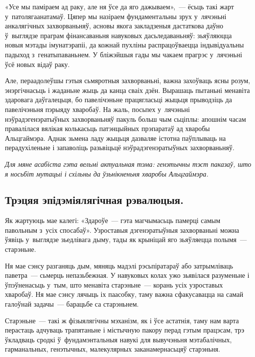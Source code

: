 
«Усе мы паміраем ад раку, але ня ўсе да яго дажываем»,~--- ёсьць такі жарт у~патолягаанатамаў. Цяпер мы назіраем фундаментальны зрух у~лячэньні анкалягічных захворваньняў, асновы якога закладзеныя дастаткова даўно ў~выглядзе праграм фінансаваньня навуковых дасьледаваньняў: зьяўляюцца новыя мэтады імунатэрапіі, да кожнай пухліны распрацоўваецца індывідуальны падыход з~генатыпаваньнем. У бліжэйшыя гады мы чакаем прагрэс у~лячэньні ўсё новых відаў раку.

Але, пераадолеўшы гэтыя сьмяротныя захворваньні, важна захоўваць ясны розум, энэргічнасьць і жаданьне жыць да канца сваіх дзён. Вырашаць пытаньні менавіта здаровага даўгалецьця, бо павелічэньне працягласьці жыцьця прыводзіць да павелічэньня пэрыяду хваробаў. На жаль, посьпех у~лячэньні нэўрадэгенэратыўных захворваньняў пакуль больш чым сьціплы: апошнім часам правалілася вялікая колькасьць патэнцыйных прэпаратаў ад хваробы Альцгаймэра. Аднак зьмена ладу жыцьця дазваляе істотна паўплываць на перадухіленьне і запаволіць разьвіцьцё нэўрадэгенэратыўных захворваньняў. 

\emph{Для мяне асабіста гэта вельмі актуальная тэма: генэтычны тэст паказаў, што я носьбіт мутацыі і схільны да ўзьнікненьня хваробы Альцгаймэра.}

\subsection*{Трэцяя эпідэміялягічная рэвалюцыя.}

Як жартуюць мае калегі: «Здароўе~--- гэта магчымасьць памерці самым павольным з~усіх спосабаў». Узроставыя дэгенэратыўныя захворваньні можна ўявіць у~выглядзе зьедлівага дыму, тады як крыніцай яго зьяўляецца полымя~--- старэньне.

Ня мае сэнсу разганяць дым, мяняць мадэлі рэсьпіратараў або затрымліваць паветра~--- сьмерць непазьбежная. У навуковых колах ужо зьявілася разуменьне і ўпэўненасьць у~тым, што менавіта старэньне~--- корань усіх узроставых хваробаў. Ня мае сэнсу лячыць іх паасобку, таму важна сфакусавацца на самай галоўнай задачы~--- барацьбе са старэньнем.

Старэньне~--- такі ж фізыялягічны мэханізм, як і ўсе астатнія, таму нам варта перастаць адчуваць трапятаньне і містычную пакору перад гэтым працэсам, трэ ўкладваць сродкі ў~фундамэнтальныя навукі для вывучэньня мэтабалічных, гарманальных, генэтычных, малекулярных заканамернасьцяў старэньня.

